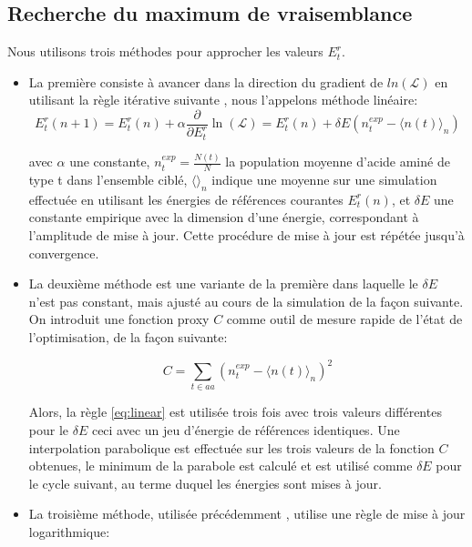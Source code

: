 \subsection{Recherche du maximum de vraisemblance}
Nous utilisons trois méthodes pour approcher les valeurs ${E^r_t}$.
\begin{itemize}
  \label{enumMeth}
\item La première consiste à avancer dans la direction du gradient de $ln(\mathcal{L})$ en utilisant la règle itérative suivante \cite{Kleinman06}, nous l'appelons méthode linéaire:
\begin{equation} \label {eq:linear}
  E^r_t(n+1) = E^r_t(n) + \alpha \frac{\partial}{\partial E^r_t} \ln(\mathcal{L})=E^r_t(n) + \delta E (n^{exp}_t - \langle n(t)\rangle_n)
\end{equation} 

avec $\alpha$ une constante, $n^{exp}_t = \frac{N(t)}{N}$ la population moyenne d'acide aminé de type t dans l'ensemble ciblé, $\langle\rangle_n$ indique une moyenne sur une simulation effectuée en utilisant les énergies de références courantes ${E^r_t(n)}$, et $\delta E$ une constante empirique avec la dimension d'une énergie, correspondant à l'amplitude de mise à jour. Cette procédure de mise à jour est répétée jusqu'à convergence.

\item La deuxième méthode est une variante de la première dans laquelle le $\delta E$ n'est pas constant, mais ajusté au cours de la simulation de la façon suivante. On introduit une fonction proxy $C$ comme outil de mesure rapide de l'état de l'optimisation, de la façon suivante:

\begin{equation} \label {eq:proxy_function}
C =\sum_{t \in aa}(n^{exp}_t - \langle n(t)\rangle_n )^2
\end{equation} 

  Alors, la règle \ref{eq:linear} est utilisée trois fois avec trois valeurs différentes pour le $\delta E$ ceci avec un jeu d'énergie de références identiques. Une interpolation parabolique est effectuée sur les trois valeurs de la fonction $C$ obtenues, le minimum de la parabole est calculé et est utilisé comme $\delta E$ pour le cycle suivant, au terme duquel les énergies sont mises à jour.

\item La troisième méthode, utilisée précédemment \cite{Schmidt08, Simonson13b}, utilise une règle de mise à jour logarithmique:


\end{itemize}
